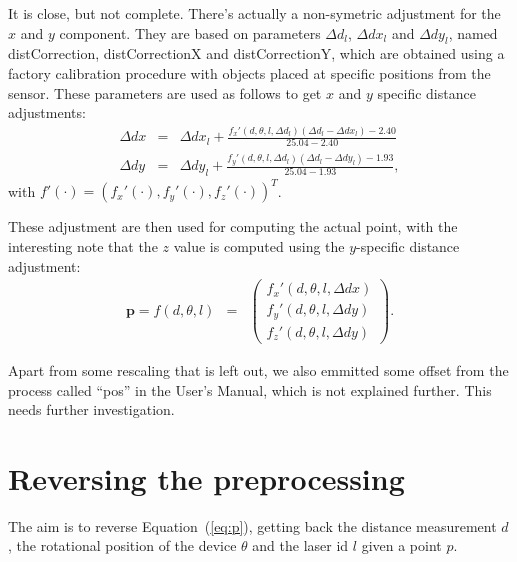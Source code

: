 \documentclass[english]{article}
\begin{document}
It is close, but not complete. There's actually a non-symetric adjustment
for the $x$ and $y$ component. They are based on parameters $\Delta
d_l$, $\Delta dx_l$ and $\Delta dy_l$, named distCorrection,
distCorrectionX and distCorrectionY, which are obtained using a factory
calibration procedure with objects placed at specific positions from the
sensor.  These parameters are used as follows to get $x$ and $y$
specific distance adjustments:
\begin{eqnarray}
  \Delta dx &=& \Delta dx_l + \frac{f_x'(d, \theta, l, \Delta d_l)(\Delta d_l - \Delta dx_l) - 2.40}{25.04 - 2.40}  \label{eq:ddx} \\
  \Delta dy &=& \Delta dy_l + \frac{f_y'(d, \theta, l, \Delta d_l)(\Delta d_l - \Delta dy_l) - 1.93}{25.04 - 1.93}, \label{eq:ddy}
\end{eqnarray}
with $f'(\cdot) = \left(f_x'(\cdot) , f_y'(\cdot) , f_z'(\cdot) \right)^T$.

These adjustment are then used for computing the actual point, with the
interesting note that the $z$ value is computed using the $y$-specific
distance adjustment:
\begin{eqnarray}
  \mathbf{p} =
  f(d, \theta, l) &=& \left(
           \begin{array}{l}
              f_x'(d, \theta, l, \Delta dx) \\
              f_y'(d, \theta, l, \Delta dy) \\
              f_z'(d, \theta, l, \Delta dy)
           \end{array}
         \right).
  \label{eq:p}
\end{eqnarray}

Apart from some rescaling that is left out, we also emmitted some offset
from the process called ``pos'' in the User's Manual, which is not
explained further. This needs further investigation.


\section{Reversing the preprocessing}
The aim is to reverse Equation~(\ref{eq:p}), getting back the distance
measurement $d$, the rotational position of the device $\theta$ and the
laser id $l$ given a point $p$.
\end{document}
